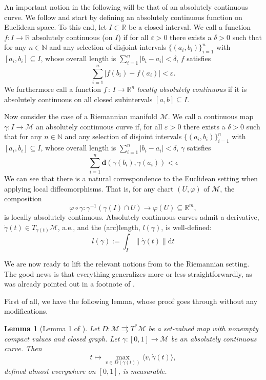 \documentclass{article}
\newtheorem{lemma}{Lemma}
\newcommand{\CM}{\mathcal{M}}
\newcommand{\BR}{\mathbb{R}}
\newcommand{\BN}{\mathbb{N}}
\newcommand{\rd}{\mathrm{d}}
\newcommand{\bd}{\mathbf{d}}
\begin{document}
An important notion in the following will be that of an absolutely continuous curve. We follow \cite{Burtscher2012LengthSO} and start by defining an absolutely continuous function on Euclidean space. To this end, let $I\subset \BR$ be a closed interval. We call a function $f: I\to\BR$ absolutely continuous (on $I$) if for all $\varepsilon>0$ there exists a $\delta>0$ such that for any $n\in\BN$ and any selection of disjoint intervals $\{(a_i,b_i)\}_{i=1}^{n}$ with $[a_i,b_i]\subseteq I$, whose overall length is $\sum_{i=1}^n|b_i-a_i|<\delta$, $f$ satisfies 
\begin{equation}
    \sum_{i=1}^n|f(b_i)-f(a_i)|<\varepsilon.
\end{equation}
We furthermore call a function $f\,:\, I\to \BR^n$ \emph{locally absolutely continuous} if it is absolutely continuous on all closed subintervals $[a,b]\subseteq I$. 

Now consider the case of a Riemannian manifold $\CM$. We call a continuous map $\gamma: I\to\CM$ an absolutely continuous curve if, for all $\varepsilon>0$ there exists a $\delta>0$ such that for any $n\in\BN$ and any selection of disjoint intervals $\{(a_i,b_i)\}_{i=1}^{n}$ with $[a_i,b_i]\subseteq I$, whose overall length is $\sum_{i=1}^n|b_i-a_i|<\delta$, $\gamma$ satisfies
\[
\sum_{i=1}^n \bd(\gamma(b_i),\gamma(a_i))<\epsilon
\]
We can see that there is a natural correspondence to the Euclidean setting when applying local diffeomorphisms. That is, for any chart $(U,\varphi)$ of $\CM$, the composition
\[
\varphi\circ \gamma :\gamma^{-1}(\gamma(I)\cap U) \to \varphi(U)\subseteq \BR^m,   
\]
is locally absolutely continuous. Absolutely continuous curves admit a derivative, $\dot\gamma(t)\in T_{\gamma(t)}\CM$, a.e., and the (arc)length, $l(\gamma)$, is well-defined:
\[
l(\gamma):= \int_I \|\dot{\gamma}(t)\|\rd t
\]

We are now ready to lift the relevant notions from \cite{bolte2021conservative} to the Riemannian setting. The good news is that everything generalizes more or less straightforwardly, as was already pointed out in a footnote of \cite{bolte2021conservative}. 

First of all, we have the following lemma, whose proof goes through without any modifications.

\begin{lemma}[Lemma 1 of \cite{bolte2021conservative}]\label{lemma1BP}
    Let $D: \CM\rightrightarrows T^*\CM$ be a set-valued map with nonempty compact values and closed graph. Let $\gamma :[0,1]\to\CM$ be an absolutely continuous curve. Then
    \begin{equation}
        t\mapsto \max_{v\in D(\gamma(t))} \langle v,\dot\gamma(t)\rangle,
    \end{equation}
    defined almost everywhere on $[0,1]$, is measurable. 
\end{lemma}
\end{document}
